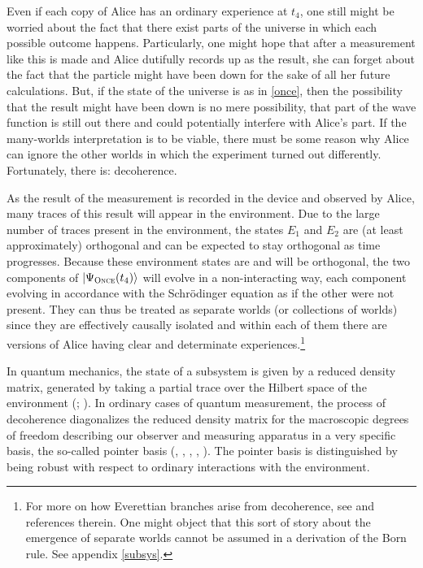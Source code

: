 \documentclass[12pt,onecolumn,secnumarabic,amsmath,amssymb,balancelastpage,nofootinbib]{article}
\newcommand{\ket}[1]{\ensuremath{\left|#1\right\rangle}}
\begin{document}
Even if each copy of Alice has an ordinary experience at $t_4$, one still might be worried about the fact that there exist parts of the universe in which each possible outcome happens.  Particularly, one might hope that after a measurement like this is made and Alice dutifully records up as the result, she can forget about the fact that the particle might have been down for the sake of all her future calculations.  But, if the state of the universe is as in \eqref{once}, then the possibility that the result might have been down is no mere possibility, that part of the wave function is still out there and could potentially interfere with Alice's part.  If the many-worlds interpretation is to be viable, there must be some reason why Alice can ignore the other worlds in which the experiment turned out differently.  Fortunately, there is: decoherence.

As the result of the measurement is recorded in the device and observed by Alice, many traces of this result will appear in the environment.  Due to the large number of traces present in the environment, the states $E_1$ and $E_2$ are (at least approximately) orthogonal and can be expected to stay orthogonal as time progresses.  Because these environment states are and will be orthogonal, the two components of $\ket{\Psi_{\textsc{Once}}(t_4)}$ will evolve in a non-interacting way, each component evolving in accordance with the Schr\"{o}dinger equation as if the other were not present.  They can thus be treated as separate worlds (or collections of worlds) since they are effectively causally isolated and within each of them there are versions of Alice having clear and determinate experiences.\footnote{For more on how Everettian branches arise from decoherence, see \citep[][]{schlosshauer2005decoherence, saunders2010} and references therein.  One might object that this sort of story about the emergence of separate worlds cannot be assumed in a derivation of the Born rule.  See appendix \ref{subsys}.}

In quantum mechanics, the state of a subsystem is given by a reduced density matrix, generated by taking a partial trace over the Hilbert space of the environment (\citealp[]{schlosshauer}; \citealp[]{nielsen2010}). In ordinary cases of quantum measurement, the process of decoherence diagonalizes the reduced density matrix for the macroscopic degrees of freedom describing our observer and measuring apparatus in a very specific basis, the so-called pointer basis (\citeauthor{Zurek:1981xq}, \citeyear{Zurek:1981xq}, \citeyear{Zurek:1982ii}, \citeyear{Zurek:1993ptp}, \citeyear{zurek2003}). The pointer basis is distinguished by being robust with respect to ordinary interactions with the environment.
\end{document}
